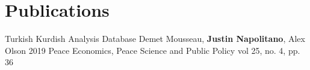 \documentclass[%
               doublesided,
               paper=a4,
               fontsize=10.5pt
              ]{my-resume}
\begin{document}
{%
       
    


    \section{Publications} 
    \pubdefaultspacing
    \justinpublication
    {Turkish Kurdish Analysis Database} %
    {Demet Mousseau, \textbf{Justin Napolitano}, Alex Olson} %
    {2019} %
    {Peace Economics, Peace Science and Public Policy vol 25, no. 4, pp. 36} %
    {} %
     

    
}
\makebody







\end{document}

